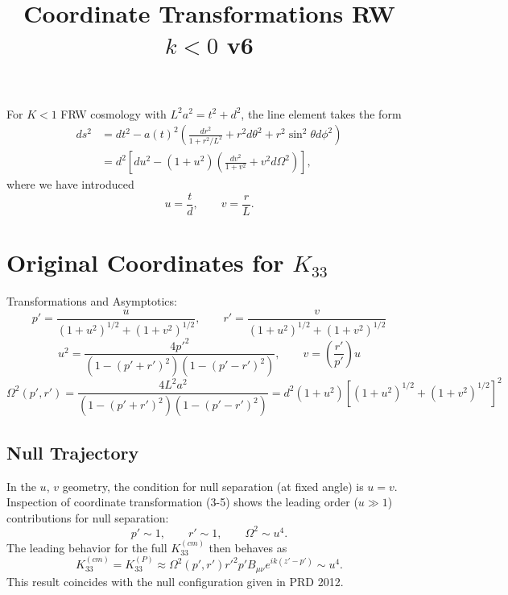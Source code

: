 \documentclass[10pt,letterpaper]{article}
\title{Coordinate Transformations RW $k<0$ v6 }
\date{}
\begin{document}
 
\maketitle
\noindent 
For $K<1$ FRW cosmology with $L^2 a^2 = t^2+d^2$, the line element takes the form
\begin{align}
ds^2 &=  dt^2 - a(t)^2 \left(  \frac{dr^2}{1+r^2/L^2} + r^2 d\theta^2 + r^2\sin^2\theta d\phi^2 \right)\nonumber\\
&= d^2 \left[ du^2 - (1+u^2)\left( \frac{dv^2}{1+v^2} + v^2 d\Omega^2\right)\right] ,
\end{align}
where we have introduced
\begin{equation}
u = \frac{t}{d},\qquad v = \frac{r}{L}.
\end{equation}
\section*{Original Coordinates for $K_{33}$}
Transformations and Asymptotics:
\begin{equation}
p' = \frac{u}{(1+u^2)^{1/2}+(1+v^2)^{1/2}},\qquad r' = \frac{v}{(1+u^2)^{1/2}+(1+v^2)^{1/2}}
\end{equation}
\begin{equation}
u^2 = \frac{4 p'^2}{(1-(p'+r')^2)(1-(p'-r')^2)},\qquad v =\left(\frac{r'}{p'}\right)u
\end{equation}
\begin{equation}
\Omega^2(p',r') = \frac{4 L^2 a^2}{(1-(p'+r')^2)(1-(p'-r')^2)} = d^2(1+u^2)\left[ (1+u^2)^{1/2}+(1+v^2)^{1/2}\right]^2
\end{equation}
\subsection*{Null Trajectory}
In the $u$, $v$ geometry, the condition for null separation (at fixed angle) is $u=v$. Inspection of coordinate transformation (3-5) shows the leading order ($u\gg 1$) contributions for null separation:
\begin{equation}
p' \sim 1,\qquad r' \sim 1,\qquad \Omega^2 \sim u^4.
\end{equation}
The leading behavior for the full $K_{33}^{(cm)}$ then behaves as
\begin{equation}
\boxed{
K^{(cm)}_{33}=K^{(P)}_{33} \approx \Omega^2(p',r') r'^2 p' B_{\mu\nu} e^{ik(z'-p')} \sim u^4.
}
\end{equation}
This result coincides with the null configuration given in PRD 2012.
\end{document}
